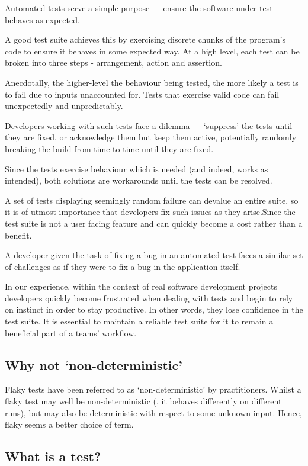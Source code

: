 Automated tests serve a simple purpose --- ensure the software under test behaves as expected.

A good test suite achieves this by exercising discrete chunks of the program's code to ensure it behaves in some expected way. At a high level, each test can be broken into three steps - arrangement, action and assertion.

Anecdotally, the higher-level the behaviour being tested, the more likely a test is to fail due to inputs unaccounted for. Tests that exercise valid code can fail unexpectedly and unpredictably.

Developers working with such tests face a dilemma --- {\lq}suppress{\rq} the tests until they are fixed, or acknowledge them but keep them active, potentially randomly breaking the build from time to time until they are fixed.

Since the tests exercise behaviour which is needed (and indeed, works as intended), both solutions are workarounds until the tests can be resolved.

A set of tests displaying seemingly random failure can devalue an entire suite, so it is of utmost importance that developers fix such issues as they arise.Since the test suite is not a user facing feature and can quickly become a cost rather than a benefit.

A developer given the task of fixing a bug in an automated test faces a similar set of challenges as if they were to fix a bug in the application itself.

In our experience, within the context of real software development projects developers quickly become frustrated when dealing with \flaky{} tests and begin to rely on instinct in order to stay productive. In other words, they lose confidence in the test suite. It is essential to maintain a reliable test suite for it to remain a beneficial part of a teams' workflow.


\subsection{Why not {\lq}non-deterministic{\rq}}

Flaky tests have been referred to as {\lq}non-deterministic{\rq} by practitioners. Whilst a flaky test may well be non-deterministic (\ie, it behaves differently on different runs), but may also be deterministic with respect to some unknown input. Hence, flaky seems a better choice of term.


\subsection{What is a \flaky{} test?}


